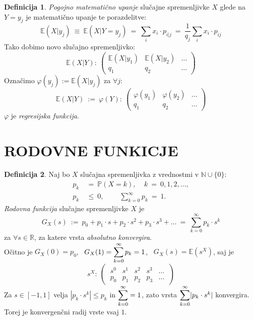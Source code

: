 \documentclass[11pt]{article}
\theoremstyle{definition}
\newtheorem{definicija}{Definicija}[section]
\theoremstyle{definition}
\theoremstyle{definition}
\begin{document}
\begin{definicija}

\textit{Pogojno matematično upanje} slučajne spremenljivke $X$ glede na $Y = y_j$ je matematično upanje te porazdelitve:
$$\mathbb{E}(X | y_j) ~\equiv~ \mathbb{E}(X | Y = y_j) ~=~ \sum_i x_i \cdot p_{i|j} ~=~ \frac{1}{q_j} \sum_i x_i \cdot p_{ij}$$
Tako dobimo novo slučajno spremenljivko:
$$\mathbb{E}(X | Y): ~\begin{pmatrix}
	\mathbb{E}(X | y_1) & \mathbb{E}(X | y_2) & \ldots \\
	q_1 & q_2 & \ldots
\end{pmatrix}$$
Označimo $\varphi(y_j) := \mathbb{E}(X | y_j)$ za $\forall j$:
$$\mathbb{E}(X | Y) ~:=~ \varphi(Y): ~\begin{pmatrix}
	\varphi(y_1) & \varphi(y_2) & \ldots \\
	q_1 & q_2 & \ldots
\end{pmatrix}$$
$\varphi$ je \textit{regresijska funkcija}.

\end{definicija}
\vspace{0.5cm}

\pagebreak


\section{RODOVNE FUNKICJE}
\vspace{0.5cm}

\begin{definicija}

Naj bo $X$ slučajna spremenljivka z vrednostmi v $\mathbb{N} \cup \{0\}$:
\begin{align*}
	p_k ~&=~ \mathbb{P}(X = k), ~~~~~k ~=~ 0, 1, 2, \ldots, \\
	p_k ~&\leq~ 0, ~~~~~~~~~~\sum_{k=0}^{\infty} p_k ~=~ 1.
\end{align*}
\textit{Rodovna funkcija} slučajne spremenljivke $X$ je 
$$G_X(s) ~:=~ p_0 + p_1 \cdot s + p_2 \cdot s^2 + p_3 \cdot s^3 + \ldots ~=~ \sum_{k=0}^{\infty} p_k \cdot s^k$$
za $\forall s \in \mathbb{R}$, za katere vrsta \textit{absolutno konvergira}. \\

\noindent Očitno je $G_X(0) = p_0$, ~$G_X(1) = \mathlarger{\sum_{k=0}^{\infty} p_k} = 1$, ~$G_X(s) = \mathbb{E}(s^X)$, saj je
$$s^X: ~\begin{pmatrix}
	~s^0 & s^1 & s^2 & s^3 & \ldots~ \\
	~p_0 & p_1 & p_2 & p_3 & \ldots~
\end{pmatrix}$$
Za $s \in [-1, 1]$ velja $|p_k \cdot s^k| \leq p_k$ in $\mathlarger{\sum_{k=0}^{\infty} = 1}$, zato vrsta $\mathlarger{\sum_{k=0}^{\infty}} |p_k \cdot s^k|$ konvergira. Torej je konvergenčni radij vrste vsaj $1$.

\end{definicija}
\vspace{0.5cm}
\end{document}
